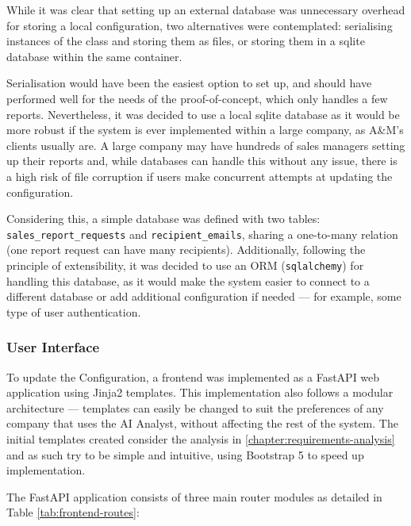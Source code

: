 \documentclass[a4paper]{report}
\begin{document}
While it was clear that setting up an external database was unnecessary overhead for storing a local configuration, two alternatives were contemplated: serialising instances of the class and storing them as files, or storing them in a sqlite database within the same container.

Serialisation would have been the easiest option to set up, and should have performed well for the needs of the proof-of-concept, which only handles a few reports. Nevertheless, it was decided to use a local sqlite database as it would be more robust if the system is ever implemented within a large company, as A\&M's clients usually are. A large company may have hundreds of sales managers setting up their reports and, while databases can handle this without any issue, there is a high risk of file corruption if users make concurrent attempts at updating the configuration.

Considering this, a simple database was defined with two tables: \texttt{sales\_report\_requests} and \texttt{recipient\_emails}, sharing a one-to-many relation (one report request can have many recipients). Additionally, following the principle of extensibility, it was decided to use an ORM (\texttt{sqlalchemy}) for handling this database, as it would make the system easier to connect to a different database or add additional configuration if needed --- for example, some type of user authentication.

\subsubsection{User Interface}

To update the Configuration, a frontend was implemented as a FastAPI web application using Jinja2 templates. This implementation also follows a modular architecture --- templates can easily be changed to suit the preferences of any company that uses the AI Analyst, without affecting the rest of the system. The initial templates created consider the analysis in \autoref{chapter:requirements-analysis} and as such try to be simple and intuitive, using Bootstrap 5 to speed up implementation.

The FastAPI application consists of three main router modules as detailed in Table \ref{tab:frontend-routes}:
\end{document}
